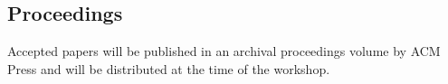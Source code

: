 \documentclass{article}
\begin{document}
\begin{tabularx}{\linewidth}
  \section*{Proceedings}

  Accepted papers will be published in an archival proceedings volume
  by ACM Press and will be distributed at the time of the workshop.
\end{tabularx}
\end{document}
